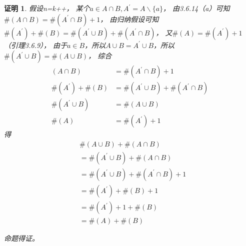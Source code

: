 \documentclass{article}
\theoremstyle{mystyle}
\theoremstyle{zproofstyle}
\newtheorem*{zproof}{证明}
\begin{document}
\begin{zproof}
  假设n=k++，
  某个$a \in A \cap B, A^\prime = A \backslash \{a\} $，
  由3.6.14（a）可知$\#(A \cap B) = \#(A^\prime \cap B) + 1$，
  由归纳假设可知$\#(A^\prime) + \#(B) = \#(A^\prime \cup B) + \#(A^\prime \cap B)$，
  又$\#(A)=\#(A^\prime)+1$（引理3.6.9），
  由于$a \in B$，所以$A \cup B = A^\prime \cup B$，所以$\#(A^\prime \cup B) = \#(A \cup B)$，
  综合
  \begin{align}
    (A \cap B)           & = \#(A^\prime \cap B) + 1                   \\
    \#(A^\prime) + \#(B) & = \#(A^\prime \cup B) + \#(A^\prime \cap B) \\
    \#(A^\prime \cup B)  & = \#(A \cup B)                              \\
    \#(A)                & = \#(A^\prime) + 1
  \end{align}
  得
  \begin{align*}
     & \#(A \cup B) + \#(A \cap B)                     \\
     & = \#(A^\prime \cup B) + \#(A \cap B)            \\
     & = \#(A^\prime \cup B) + \#(A^\prime \cap B) + 1 \\
     & = \#(A^\prime) + \#(B) + 1                      \\
     & = \#(A^\prime) + 1 + \#(B)                      \\
     & = \#(A) + \#(B)
  \end{align*}

  命题得证。
\end{zproof}
\end{document}

